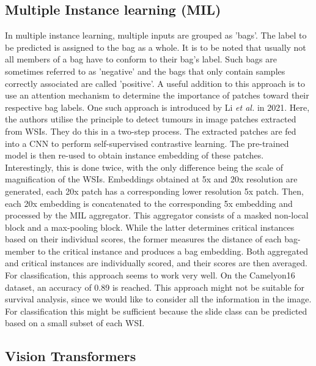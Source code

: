  \subsection{Multiple Instance learning (MIL)}

In multiple instance learning, multiple inputs are grouped as 'bags'. The label to be predicted is assigned to the bag as a whole. It is to be noted that usually not all members of a bag have to conform to their bag's label. Such bags are sometimes referred to as 'negative' and the bags that only contain samples correctly associated are called 'positive'. A useful addition to this approach is to use an attention mechanism to determine the importance of patches toward their respective bag labels. \cite{Ilse2018Attention}
One such approach is introduced by Li \textit{et al.} in 2021. Here, the authors utilise the principle to detect tumours in image patches extracted from WSIs. They do this in a two-step process. The extracted patches are fed into a CNN to perform self-supervised contrastive learning. The pre-trained model is then re-used to obtain instance embedding of these patches. Interestingly, this is done twice, with the only difference being the scale of magnification of the WSIs. Embeddings obtained at 5x and 20x resolution are generated, each 20x patch has a corresponding lower resolution 5x patch. Then, each 20x embedding is concatenated to the corresponding 5x embedding and processed by the MIL aggregator. This aggregator consists of a masked non-local block and a max-pooling block. While the latter determines critical instances based on their individual scores, the former measures the distance of each bag-member to the critical instance and produces a bag embedding. Both aggregated and critical instances are individually scored, and their scores are then averaged. For classification, this approach seems to work very well. On the Camelyon16 dataset, an accuracy of 0.89 is reached. \cite{Lu2021Data}
This approach might not be suitable for survival analysis, since we would like to consider all the information in the image. For classification this might be sufficient because the slide class can be predicted based on a small subset of each WSI.

\subsection{Vision Transformers}

